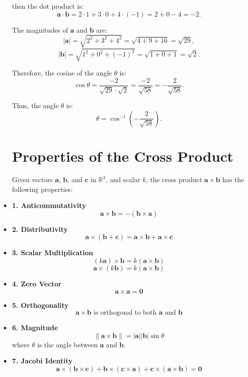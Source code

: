\documentclass[a4paper,12pt]{article}
\begin{document}
\begin{itemize}[leftmargin=*]
then the dot product is:
\[
\mathbf{a} \cdot \mathbf{b} = 2 \cdot 1 + 3 \cdot 0 + 4 \cdot (-1) = 2 + 0 - 4 = -2.
\]

The magnitudes of \(\mathbf{a}\) and \(\mathbf{b}\) are:
\[
|\mathbf{a}| = \sqrt{2^2 + 3^2 + 4^2} = \sqrt{4 + 9 + 16} = \sqrt{29},
\]
\[
|\mathbf{b}| = \sqrt{1^2 + 0^2 + (-1)^2} = \sqrt{1 + 0 + 1} = \sqrt{2}.
\]

Therefore, the cosine of the angle \(\theta\) is:
\[
\cos \theta = \frac{-2}{\sqrt{29} \cdot \sqrt{2}} = \frac{-2}{\sqrt{58}} = -\frac{2}{\sqrt{58}}.
\]

Thus, the angle \(\theta\) is:
\[
\theta = \cos^{-1} \left( -\frac{2}{\sqrt{58}} \right).
\]

\section*{Properties of the Cross Product}

Given vectors \(\mathbf{a}\), \(\mathbf{b}\), and \(\mathbf{c}\) in \(\mathbb{R}^3\), and scalar \(k\), the cross product \(\mathbf{a} \times \mathbf{b}\) has the following properties:

\item \textbf{1. Anticommutativity}
\[
\mathbf{a} \times \mathbf{b} = - (\mathbf{b} \times \mathbf{a})
\]

\item \textbf{2. Distributivity}
\[
\mathbf{a} \times (\mathbf{b} + \mathbf{c}) = \mathbf{a} \times \mathbf{b} + \mathbf{a} \times \mathbf{c}
\]

\item \textbf{3. Scalar Multiplication}
\[
(k \mathbf{a}) \times \mathbf{b} = k (\mathbf{a} \times \mathbf{b})
\]
\[
\mathbf{a} \times (k \mathbf{b}) = k (\mathbf{a} \times \mathbf{b})
\]

\item \textbf{4. Zero Vector}
\[
\mathbf{a} \times \mathbf{a} = \mathbf{0}
\]

\item \textbf{5. Orthogonality}
\[
\mathbf{a} \times \mathbf{b} \text{ is orthogonal to both } \mathbf{a} \text{ and } \mathbf{b}
\]

\item \textbf{6. Magnitude}
\[
\|\mathbf{a} \times \mathbf{b}\| = |\mathbf{a}| |\mathbf{b}| \sin \theta
\]
where \(\theta\) is the angle between \(\mathbf{a}\) and \(\mathbf{b}\).

\item \textbf{7. Jacobi Identity}
\[
\mathbf{a} \times (\mathbf{b} \times \mathbf{c}) + \mathbf{b} \times (\mathbf{c} \times \mathbf{a}) + \mathbf{c} \times (\mathbf{a} \times \mathbf{b}) = \mathbf{0}
\]


\end{itemize}
\end{document}
